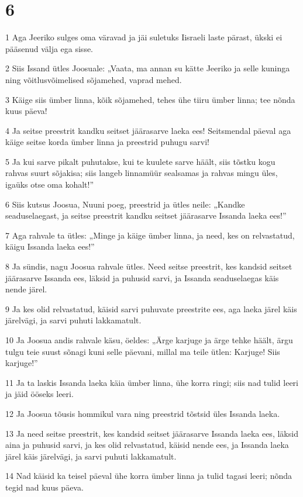 \chapter{6}

\par 1 Aga Jeeriko sulges oma väravad ja jäi suletuks Iisraeli laste pärast, ükski ei pääsenud välja ega sisse.
\par 2 Siis Issand ütles Joosuale: „Vaata, ma annan su kätte Jeeriko ja selle kuninga ning võitlusvõimelised sõjamehed, vaprad mehed.
\par 3 Käige siis ümber linna, kõik sõjamehed, tehes ühe tiiru ümber linna; tee nõnda kuus päeva!
\par 4 Ja seitse preestrit kandku seitset jäärasarve laeka ees! Seitsmendal päeval aga käige seitse korda ümber linna ja preestrid puhugu sarvi!
\par 5 Ja kui sarve pikalt puhutakse, kui te kuulete sarve häält, siis tõstku kogu rahvas suurt sõjakisa; siis langeb linnamüür sealsamas ja rahvas mingu üles, igaüks otse oma kohalt!”
\par 6 Siis kutsus Joosua, Nuuni poeg, preestrid ja ütles neile: „Kandke seaduselaegast, ja seitse preestrit kandku seitset jäärasarve Issanda laeka ees!”
\par 7 Aga rahvale ta ütles: „Minge ja käige ümber linna, ja need, kes on relvastatud, käigu Issanda laeka ees!”
\par 8 Ja sündis, nagu Joosua rahvale ütles. Need seitse preestrit, kes kandsid seitset jäärasarve Issanda ees, läksid ja puhusid sarvi, ja Issanda seaduselaegas käis nende järel.
\par 9 Ja kes olid relvastatud, käisid sarvi puhuvate preestrite ees, aga laeka järel käis järelvägi, ja sarvi puhuti lakkamatult.
\par 10 Ja Joosua andis rahvale käsu, öeldes: „Ärge karjuge ja ärge tehke häält, ärgu tulgu teie suust sõnagi kuni selle päevani, millal ma teile ütlen: Karjuge! Siis karjuge!”
\par 11 Ja ta laskis Issanda laeka käia ümber linna, ühe korra ringi; siis nad tulid leeri ja jäid ööseks leeri.
\par 12 Ja Joosua tõusis hommikul vara ning preestrid tõstsid üles Issanda laeka.
\par 13 Ja need seitse preestrit, kes kandsid seitset jäärasarve Issanda laeka ees, läksid aina ja puhusid sarvi, ja kes olid relvastatud, käisid nende ees, ja Issanda laeka järel käis järelvägi, ja sarvi puhuti lakkamatult.
\par 14 Nad käisid ka teisel päeval ühe korra ümber linna ja tulid tagasi leeri; nõnda tegid nad kuus päeva.
